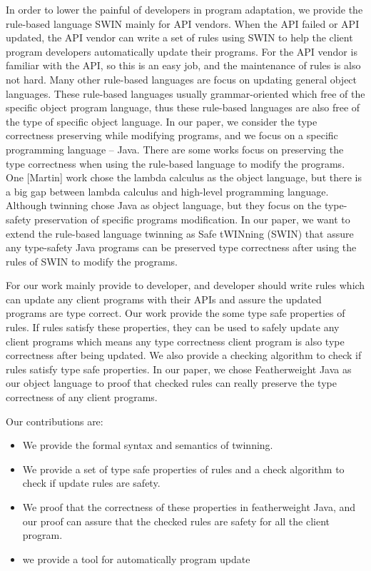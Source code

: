 In order to lower the painful of developers in program adaptation, we provide the rule-based
language SWIN mainly for API vendors.
When the API failed or API updated, the API vendor can
write a set of rules using SWIN to help the client program developers automatically update their 
programs. For the API vendor is familiar with the API, 
so this is an easy job, and the maintenance of rules is
also not hard. 
Many other rule-based languages are focus on updating general object languages. 
These rule-based languages 
usually grammar-oriented
which free of the specific object program language,
thus these rule-based languages are also free of the type of specific object language. 
In our
paper, we consider the type correctness preserving while modifying programs, 
and we focus on a specific programming language -- Java.
There are some works focus
on preserving the type correctness when using the rule-based language to modify
the programs. One [Martin] work chose the lambda calculus as the object language,
but there is a big gap between lambda calculus and high-level programming language.
Although twinning\cite{twinning} chose Java as object language, but they focus on
the type-safety preservation of specific programs modification. In our paper, we want to extend
the rule-based language twinning as Safe tWINning (SWIN) that assure any type-safety Java
programs can be preserved type correctness after using the rules of SWIN to modify the programs.

For our work mainly provide to developer, and developer should write rules which can update any
client programs with their APIs and assure the updated programs are type correct. Our work
provide the some type safe properties of rules. If rules satisfy these properties, 
they can be used to safely
update any client programs which means any type correctness client program is also 
type correctness after being updated.
We also provide a checking algorithm to check if rules satisfy type safe properties.
In our paper, we chose Featherweight Java as our object language to proof that checked rules can 
really preserve the
type correctness of any client programs.

Our contributions are:
\begin{itemize}
\item We provide the formal syntax and semantics of twinning. 
\item We provide a set of type safe properties of rules and a check algorithm to check if update rules are safety.
\item We proof that the correctness of these properties in featherweight Java, and our proof can 
    assure that the checked rules are safety for all the client program.
\item we provide a tool for automatically program update
\end{itemize}

